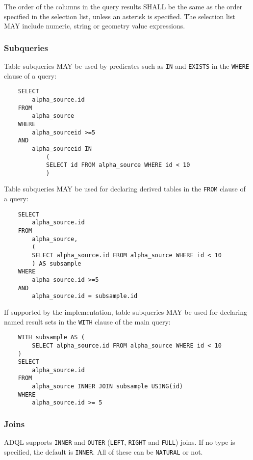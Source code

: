 \documentclass[11pt,a4paper]{ivoa}
\begin{document}
The order of the columns in the query results SHALL be the same as the
order specified in the selection list,
unless an asterisk is specified.
The selection list MAY include numeric,
string or geometry value expressions.

\subsubsection{Subqueries}
\label{sec:subqueries}

Table subqueries MAY be used by predicates such as \verb:IN: and \verb:EXISTS:
in the \verb:WHERE: clause of a query:

\begin{verbatim}
    SELECT
        alpha_source.id
    FROM
        alpha_source
    WHERE
        alpha_sourceid >=5
    AND
        alpha_sourceid IN
            (
            SELECT id FROM alpha_source WHERE id < 10
            )
\end{verbatim}

Table subqueries MAY be used for declaring derived tables in the \verb:FROM: clause
of a query:

\begin{verbatim}
    SELECT
        alpha_source.id
    FROM
        alpha_source,
        (
        SELECT alpha_source.id FROM alpha_source WHERE id < 10
        ) AS subsample
    WHERE
        alpha_source.id >=5
    AND
        alpha_source.id = subsample.id
\end{verbatim}

If supported by the implementation, table subqueries MAY be used for declaring
named result sets in the \verb:WITH: clause of the main query:

\begin{verbatim}
    WITH subsample AS (
        SELECT alpha_source.id FROM alpha_source WHERE id < 10
    )
    SELECT
        alpha_source.id
    FROM
        alpha_source INNER JOIN subsample USING(id)
    WHERE
        alpha_source.id >= 5
\end{verbatim}

\subsubsection{Joins}
\label{sec:joins}

ADQL supports \verb:INNER: and \verb:OUTER:
(\verb:LEFT:, \verb:RIGHT: and \verb:FULL:) joins. If no type is specified, the
default is \verb:INNER:. All of these can be \verb:NATURAL: or not.
\end{document}
